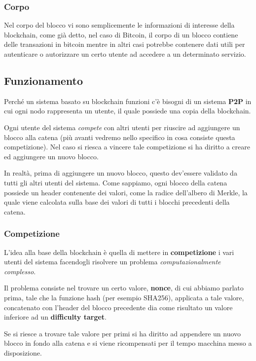 \documentclass[11pt, a4paper]{article}
\begin{document}
\subsubsection{Corpo}
Nel corpo del blocco vi sono semplicemente le informazioni di interesse della blockchain, come già detto, nel caso
di Bitcoin, il corpo di un blocco contiene delle transazioni in bitcoin mentre in altri casi potrebbe contenere
dati utili per autenticare o autorizzare un certo utente ad accedere a un determinato servizio.

\subsection{Funzionamento}
Perché un sistema basato su blockchain funzioni c'è bisogni di un sistema \textbf{P2P} in cui ogni nodo
rappresenta un utente, il quale possiede una copia della blockchain.

Ogni utente del sistema \emph{compete} con altri utenti per riuscire ad aggiungere un blocco alla catena (più
avanti vedremo nello specifico in cosa consiste questa competizione). Nel caso si riesca a vincere tale
competizione si ha diritto a creare ed aggiungere un nuovo blocco.

In realtà, prima di aggiungere un nuovo blocco, questo dev'essere validato da tutti gli altri utenti del
sistema. Come sappiamo, ogni blocco della catena possiede un header contenente dei valori, come la radice
dell'albero di Merkle, la quale viene calcolata sulla base dei valori di tutti i blocchi precedenti della
catena.

\subsubsection{Competizione}
L'idea alla base della blockchain è quella di mettere in \textbf{competizione} i vari utenti del sistema facendogli
risolvere un problema \emph{computazionalmente complesso}.

Il problema consiste nel trovare un certo valore, \textbf{nonce}, di cui abbiamo parlato prima, tale che la funzione
hash (per esempio SHA256), applicata a tale valore, concatenato con l'header del blocco precedente dia come
risultato un valore inferiore ad un \textbf{difficulty target}.

Se si riesce a trovare tale valore per primi si ha diritto ad appendere un nuovo blocco in fondo alla catena e si
viene ricompensati per il tempo macchina messo a disposizione.
\end{document}
